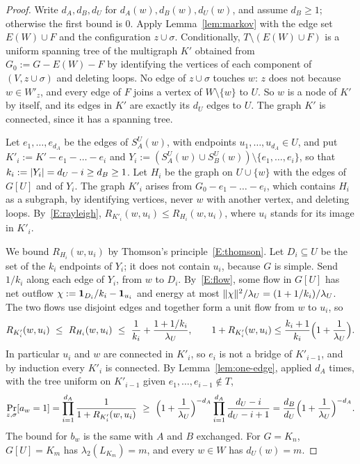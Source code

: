 \begin{proof}
Write $d_A,d_B,d_U$ for $d_A(w),d_B(w),d_U(w)$, and assume $d_B\ge1$; otherwise the first bound is $0$. Apply Lemma~\ref{lem:markov} with the edge set $E(W)\cup F$ and the configuration $z\cup\sigma$. Conditionally, $T\setminus(E(W)\cup F)$ is a uniform spanning tree of the multigraph $K'$ obtained from $G_0:=G-E(W)-F$ by identifying the vertices of each component of $(V,z\cup\sigma)$ and deleting loops. No edge of $z\cup\sigma$ touches $w$: $z$ does not because $w\in W'_z$, and every edge of $F$ joins a vertex of $W\setminus\{w\}$ to $U$. So $w$ is a node of $K'$ by itself, and its edges in $K'$ are exactly its $d_U$ edges to $U$. The graph $K'$ is connected, since it has a spanning tree.

Let $e_1,\dots,e_{d_A}$ be the edges of $S^U_A(w)$, with endpoints $u_1,\dots,u_{d_A}\in U$, and put $K'_i:=K'-e_1-\dots-e_i$ and $Y_i:=(S^U_A(w)\cup S^U_B(w))\setminus\{e_1,\dots,e_i\}$, so that $k_i:=\lvert Y_i\rvert=d_U-i\ge d_B\ge1$. Let $H_i$ be the graph on $U\cup\{w\}$ with the edges of $G[U]$ and of $Y_i$. The graph $K'_i$ arises from $G_0-e_1-\dots-e_i$, which contains $H_i$ as a subgraph, by identifying vertices, never $w$ with another vertex, and deleting loops. By~\ref{E:rayleigh}, $R_{K'_i}(w,u_i)\le R_{H_i}(w,u_i)$, where $u_i$ stands for its image in $K'_i$.

We bound $R_{H_i}(w,u_i)$ by Thomson's principle~\ref{E:thomson}. Let $D_i\subseteq U$ be the set of the $k_i$ endpoints of $Y_i$; it does not contain $u_i$, because $G$ is simple. Send $1/k_i$ along each edge of $Y_i$, from $w$ to $D_i$. By~\ref{E:flow}, some flow in $G[U]$ has net outflow $\chi:=\mathbf{1}_{D_i}/k_i-\mathbf{1}_{u_i}$ and energy at most $\lVert \chi\rVert^2/\lambda_U=(1+1/k_i)/\lambda_U$. The two flows use disjoint edges and together form a unit flow from $w$ to $u_i$, so
\[
  R_{K'_i}(w,u_i)\ \le\ R_{H_i}(w,u_i)\ \le\ \frac1{k_i}+\frac{1+1/k_i}{\lambda_U},\qquad 1+R_{K'_i}(w,u_i)\le\frac{k_i+1}{k_i}\Bigl(1+\frac1{\lambda_U}\Bigr).
\]
In particular $u_i$ and $w$ are connected in $K'_i$, so $e_i$ is not a bridge of $K'_{i-1}$, and by induction every $K'_i$ is connected. By Lemma~\ref{lem:one-edge}, applied $d_A$ times, with the tree uniform on $K'_{i-1}$ given $e_1,\dots,e_{i-1}\notin T$,
\[
  \Pr_{z,\sigma}[a_w=1]=\prod_{i=1}^{d_A}\frac1{1+R_{K'_i}(w,u_i)}\ \ge\ \Bigl(1+\frac1{\lambda_U}\Bigr)^{-d_A}\prod_{i=1}^{d_A}\frac{d_U-i}{d_U-i+1}=\frac{d_B}{d_U}\Bigl(1+\frac1{\lambda_U}\Bigr)^{-d_A}.
\]
The bound for $b_w$ is the same with $A$ and $B$ exchanged. For $G=K_n$, $G[U]=K_m$ has $\lambda_2(L_{K_m})=m$, and every $w\in W$ has $d_U(w)=m$.
\end{proof}

